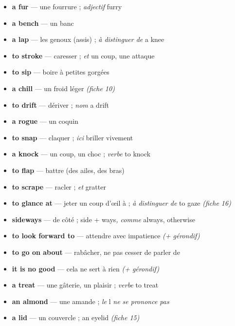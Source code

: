 \documentclass{fiche}
\begin{document}


\begin{itemize}[label=--,itemsep=0.8mm,leftmargin=*]\small
  \item \textbf{a fur} — une fourrure ; \textit{adjectif} furry
  \item \textbf{a bench} — un banc
  \item \textbf{a lap} — les genoux (assis) ; \textit{à distinguer de} a knee
  \item \textbf{to stroke} — caresser ; \textit{et} un coup, une attaque
  \item \textbf{to sip} — boire à petites gorgées
  \item \textbf{a chill} — un froid léger \textit{(fiche 10)}
  \item \textbf{to drift} — dériver ; \textit{nom} a drift
  \item \textbf{a rogue} — un coquin
  \item \textbf{to snap} — claquer ; \textit{ici} briller vivement
  \item \textbf{a knock} — un coup, un choc ; \textit{verbe} to knock
  \item \textbf{to flap} — battre (des ailes, des bras)
  \item \textbf{to scrape} — racler ; \textit{et} gratter
  \item \textbf{to glance at} — jeter un coup d'œil à ; \textit{à distinguer de} to gaze \textit{(fiche 16)}
  \item \textbf{sideways} — de côté ; side + ways\textit{, comme} always, otherwise
  \item \textbf{to look forward to} — attendre avec impatience \textit{(+ gérondif)}
  \item \textbf{to go on about} — rabâcher, ne pas cesser de parler de
  \item \textbf{it is no good} — cela ne sert à rien \textit{(+ gérondif)}
  \item \textbf{a treat} — une gâterie, un plaisir ; \textit{verbe} to treat
  \item \textbf{an almond} — une amande ; \textit{le} l \textit{ne se prononce pas}
  \item \textbf{a lid} — un couvercle ; an eyelid \textit{(fiche 15)}
\end{itemize}
\end{document}
